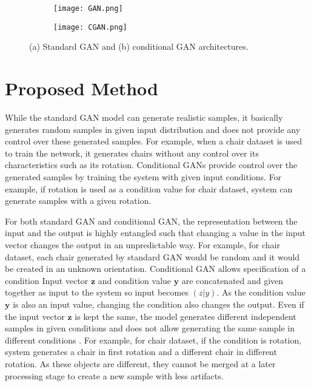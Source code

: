 \documentclass[runningheads]{llncs}
\begin{document}
\begin{figure}
\centering
\begin{subfigure}{.7\textwidth}
  \centering
  \texttt{[image: GAN.png]}
  \caption{}
  \label{fig:sfig1}
\end{subfigure}%

\begin{subfigure}{.7\textwidth}
  \centering
  \texttt{[image: CGAN.png]}
  \caption{}
  \label{fig:sfig2}
\end{subfigure}
\caption{(a) Standard GAN and (b) conditional GAN architectures.}
\label{fig:fig1}
\end{figure}



\section{Proposed Method}
\label{sect:method}
While the standard GAN model can generate realistic samples, it basically generates random samples in given input distribution and does not provide any control over these generated samples. For example, when a chair dataset is used to train the network, it generates chairs without any control over its characteristics such as its rotation. Conditional GANs provide control over the generated samples by training the system with given input conditions. For example, if rotation is used as a condition value for chair dataset, system can generate samples with a given rotation. 

	For both standard GAN and conditional GAN, the representation between the input and the output is highly entangled such that changing a value in the input vector changes the output in an unpredictable way. For example, for chair dataset, each chair generated by standard GAN would be random and it would be created in an unknown orientation. Conditional GAN allows specification of a condition Input vector $\mathbf{z}$ and condition value $\mathbf{y}$  are concatenated and given together as input to the system so input becomes $(z|y)$. As the condition value $\mathbf{y}$  is also an input value, changing the condition also changes the output. Even if the input vector $\mathbf{z}$ is kept the same, the model generates different independent samples in given conditions and does not allow generating the same sample in different conditions \cite{liu2016coupled,mao2017aligngan}. For example, for chair dataset, if the condition is rotation, system generates a chair in first rotation and a different chair in different rotation. As these objects are different, they cannot be merged at a later processing stage to create a new sample with less artifacts.
	
\end{document}
